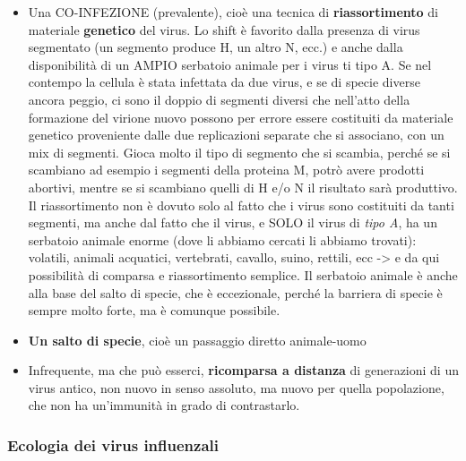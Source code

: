 \begin{itemize}
\item
  Una CO-INFEZIONE (prevalente), cioè una tecnica di
  \textbf{riassortimento} di materiale \textbf{genetico} del virus. Lo
  shift è favorito dalla presenza di virus segmentato (un segmento
  produce H, un altro N, ecc.) e anche dalla disponibilità di un AMPIO
  serbatoio animale per i virus ti tipo A. Se nel contempo la cellula è
  stata infettata da due virus, e se di specie diverse ancora peggio, ci
  sono il doppio di segmenti diversi che nell'atto della formazione del
  virione nuovo possono per errore essere costituiti da materiale
  genetico proveniente dalle due replicazioni separate che si associano,
  con un mix di segmenti. Gioca molto il tipo di segmento che si
  scambia, perché se si scambiano ad esempio i segmenti della proteina
  M, potrò avere prodotti abortivi, mentre se si scambiano quelli di H
  e/o N il risultato sarà produttivo. Il riassortimento non è dovuto
  solo al fatto che i virus sono costituiti da tanti segmenti, ma anche
  dal fatto che il virus, e SOLO il virus di \emph{tipo A}, ha un
  serbatoio animale enorme (dove li abbiamo cercati li abbiamo trovati):
  volatili, animali acquatici, vertebrati, cavallo, suino, rettili, ecc
  -> e da qui possibilità di comparsa e riassortimento semplice. Il
  serbatoio animale è anche alla base del salto di specie, che è
  eccezionale, perché la barriera di specie è sempre molto forte, ma è
  comunque possibile.

\item
  \textbf{Un salto di specie}, cioè un passaggio diretto animale-uomo
\item
  Infrequente, ma che può esserci, \textbf{ricomparsa a distanza} di
  generazioni di un virus antico, non nuovo in senso assoluto, ma nuovo
  per quella popolazione, che non ha un'immunità in grado di
  contrastarlo.
\end{itemize}

\subsubsection{Ecologia dei virus influenzali}

